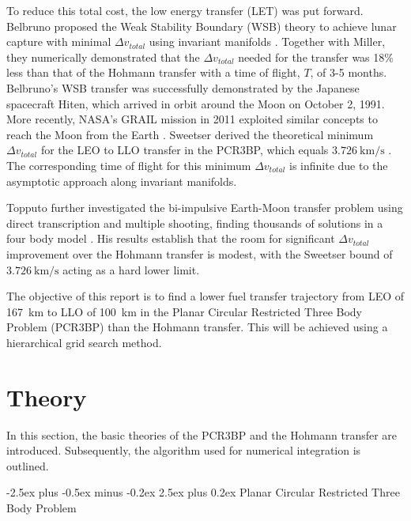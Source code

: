 \documentclass[10pt,twocolumn]{revtex4-2}    %
\makeatletter
\renewcommand{\subsection}{\@startsection{subsection}{2}{\z@}%
  {-2.5ex plus -0.5ex minus -0.2ex}%
  {2.5ex plus 0.2ex}%
  {\normalfont\normalsize\bfseries}}
\makeatother
\begin{document}
\vspace{0.5em}

To reduce this total cost, the low energy transfer (LET) was put forward. Belbruno proposed the Weak Stability Boundary (WSB) theory to achieve lunar capture with minimal $\Delta v_{total}$ using invariant manifolds \cite{Belbruno1993}. Together with Miller, they numerically demonstrated that the $\Delta v_{total}$ needed for the transfer was 18\% less than that of the Hohmann transfer with a time of flight, $T$, of 3-5 months. Belbruno's WSB transfer was successfully demonstrated by the Japanese spacecraft Hiten, which arrived in orbit around the Moon on October 2, 1991. More recently, NASA's GRAIL mission in 2011 exploited similar concepts to reach the Moon from the Earth \cite{roncoli2010}. Sweetser derived the theoretical minimum $\Delta v_{total}$ for the LEO to LLO transfer in the PCR3BP, which equals $3.726~\mathrm{km/s}$ \cite{Sweetser1991}. The corresponding time of flight for this minimum $\Delta v_{total}$ is infinite due to the asymptotic approach along invariant manifolds.

\vspace{0.5em}

Topputo further investigated the bi-impulsive Earth-Moon transfer problem using direct transcription and multiple shooting, finding thousands of solutions in a four body model \cite{topputo2013}. His results establish that the room for significant $\Delta v_{total}$ improvement over the Hohmann transfer is modest, with the Sweetser bound of $3.726~\mathrm{km/s}$ acting as a hard lower limit.  

\vspace{0.5em}

The objective of this report is to find a lower fuel transfer trajectory from LEO of 167~km to LLO of 100~km in the Planar Circular Restricted Three Body Problem (PCR3BP) than the Hohmann transfer. This will be achieved using a hierarchical grid search method. 

\clearpage

\section{Theory}
\label{sec:Theory}

In this section, the basic theories of the PCR3BP and the Hohmann transfer are introduced. Subsequently, the algorithm used for numerical integration is outlined.

\subsection{Planar Circular Restricted Three Body Problem}
\label{sec:Planar Circular Restricted 3 Body Problem}
\end{document}

